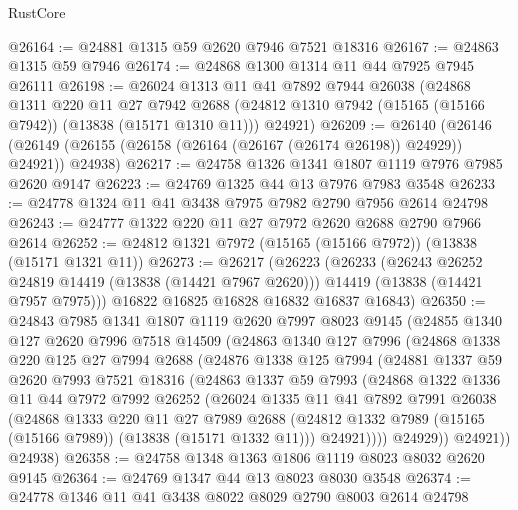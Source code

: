 \begin{lexlean}{RustCore}
\begin{coremodule}
@26164 := @24881 @1315 @59 @2620 @7946 @7521 @18316
@26167 := @24863 @1315 @59 @7946
@26174 := @24868 @1300 @1314 @11 @44 @7925 @7945 @26111
@26198 := @26024
    @1313
    @11
    @41
    @7892
    @7944
    @26038
    (@24868
      @1311
      @220
      @11
      @27
      @7942
      @2688
      (@24812 @1310 @7942 (@15165 (@15166 @7942)) (@13838 (@15171 @1310 @11)))
      @24921)
@26209 := @26140
    (@26146 (@26149 (@26155 (@26158 (@26164 (@26167 (@26174 @26198)) @24929)) @24921)) @24938)
@26217 := @24758 @1326 @1341 @1807 @1119 @7976 @7985 @2620 @9147
@26223 := @24769 @1325 @44 @13 @7976 @7983 @3548
@26233 := @24778 @1324 @11 @41 @3438 @7975 @7982 @2790 @7956 @2614 @24798
@26243 := @24777 @1322 @220 @11 @27 @7972 @2620 @2688 @2790 @7966 @2614
@26252 := @24812 @1321 @7972 (@15165 (@15166 @7972)) (@13838 (@15171 @1321 @11))
@26273 := @26217
    (@26223
      (@26233
        (@26243 @26252 @24819 @14419 (@13838 (@14421 @7967 @2620)))
        @14419
        (@13838 (@14421 @7957 @7975)))
      @16822
      @16825
      @16828
      @16832
      @16837
      @16843)
@26350 := @24843
    @7985
    @1341
    @1807
    @1119
    @2620
    @7997
    @8023
    @9145
    (@24855
      @1340
      @127
      @2620
      @7996
      @7518
      @14509
      (@24863
        @1340
        @127
        @7996
        (@24868
          @1338
          @220
          @125
          @27
          @7994
          @2688
          (@24876
            @1338
            @125
            @7994
            (@24881
              @1337
              @59
              @2620
              @7993
              @7521
              @18316
              (@24863
                @1337
                @59
                @7993
                (@24868
                  @1322
                  @1336
                  @11
                  @44
                  @7972
                  @7992
                  @26252
                  (@26024
                    @1335
                    @11
                    @41
                    @7892
                    @7991
                    @26038
                    (@24868
                      @1333
                      @220
                      @11
                      @27
                      @7989
                      @2688
                      (@24812 @1332 @7989 (@15165 (@15166 @7989)) (@13838 (@15171 @1332 @11)))
                      @24921))))
              @24929))
          @24921))
      @24938)
@26358 := @24758 @1348 @1363 @1806 @1119 @8023 @8032 @2620 @9145
@26364 := @24769 @1347 @44 @13 @8023 @8030 @3548
@26374 := @24778 @1346 @11 @41 @3438 @8022 @8029 @2790 @8003 @2614 @24798

\end{coremodule}
\end{lexlean}
